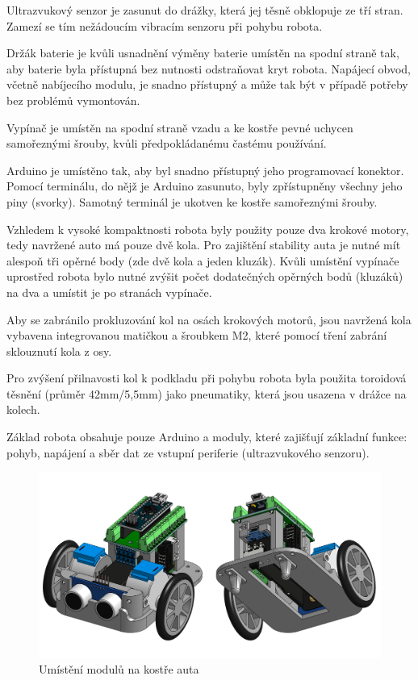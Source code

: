 \documentclass[12pt]{article}
\begin{document}
\begin{spacing}{1.5}
	Ultrazvukový senzor je zasunut do drážky, která jej těsně obklopuje ze tří stran. Zamezí se tím nežádoucím vibracím senzoru při pohybu robota.
	
	Držák baterie je kvůli usnadnění výměny baterie umístěn na spodní straně tak, aby baterie byla přístupná bez nutnosti odstraňovat kryt robota. Napájecí obvod, včetně nabíjecího modulu, je snadno přístupný a může tak být v případě potřeby bez problémů vymontován.
	
	Vypínač je umístěn na spodní straně vzadu a ke kostře pevné uchycen samořeznými šrouby, kvůli předpokládanému častému používání.
	
	Arduino je umístěno tak, aby byl snadno přístupný jeho programovací konektor. Pomocí terminálu, do nějž je Arduino zasunuto, byly zpřístupněny všechny jeho piny (svorky). Samotný terminál je ukotven ke kostře samořeznými šrouby.
	
	Vzhledem k vysoké kompaktnosti robota byly použity pouze dva krokové motory, tedy navržené auto má pouze dvě kola. Pro zajištění stability auta je nutné mít alespoň tři opěrné body (zde dvě kola a jeden kluzák). Kvůli umístění vypínače uprostřed robota bylo nutné zvýšit počet dodatečných opěrných bodů (kluzáků) na dva a umístit je po stranách vypínače.
	
	Aby se zabránilo prokluzování kol na osách krokových motorů, jsou navržená kola vybavena integrovanou matičkou a šroubkem M2, které pomocí tření zabrání sklouznutí kola z osy.
	
	Pro zvýšení přilnavosti kol k podkladu při pohybu robota byla použita toroidová těsnění (průměr 42mm/5,5mm) jako pneumatiky, která jsou usazena v drážce na kolech.
	
	Základ robota obsahuje pouze Arduino a moduly, které zajišťují základní funkce: pohyb, napájení a sběr dat ze vstupní periferie (ultrazvukového senzoru).
	
	\begin{figure}[H]
		\centering
		\includegraphics[width=\linewidth]{moduly_kostra}
		\caption{Umístění modulů na kostře auta}
		\label{fig:moduly_kostra}
	\end{figure}
	

\end{spacing}
\end{document}
